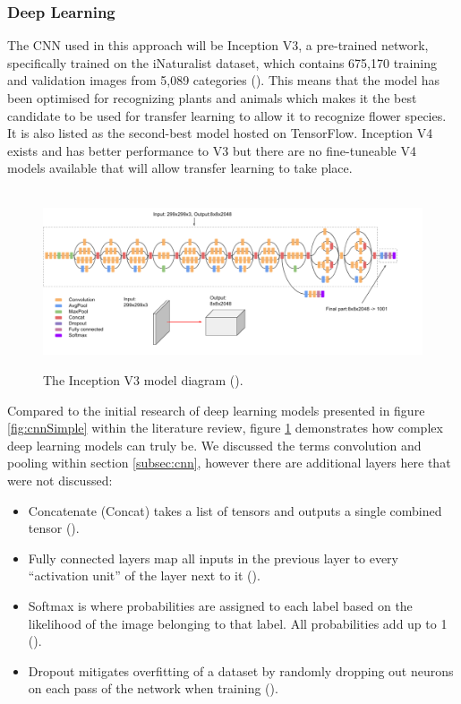\documentclass{article}
\begin{document}
\subsubsection{Deep Learning}

The CNN used in this approach will be Inception V3, a pre-trained network, specifically trained on the iNaturalist 
dataset, which contains 675,170 training and validation images from 5,089 categories (\cite{paperswithcode}). 
This means that the model has been optimised for recognizing plants and animals which makes it the best candidate to be 
used for transfer learning to allow it to recognize flower species. It is also listed as the second-best model hosted on
TensorFlow. Inception V4 exists and has better performance to V3 but there are no fine-tuneable V4 models available that
will allow transfer learning to take place.   

\begin{figure}[h]\
    \centering
    \includegraphics[width=\textwidth]{inceptionv3.png}
    \caption{The Inception V3 model diagram (\cite{GoogleCloud}).}
    \label{fig:inception}
\end{figure}

Compared to the initial research of deep learning models presented in figure \ref{fig:cnnSimple} within the literature 
review, figure \ref{fig:inception} demonstrates how complex deep learning models can truly be. 
We discussed the terms convolution and pooling within section \ref{subsec:cnn}, however there are additional layers here that were 
not discussed:

\begin{itemize}
    \item Concatenate (Concat) takes a list of tensors and outputs a single combined tensor (\cite{kerasconcat}).
    \item Fully connected layers map all inputs in the previous layer to every “activation unit” of the layer next to it
(\cite{singhsurya}).
    \item Softmax is where probabilities are assigned to each label based on the likelihood of the image belonging to 
that label. All probabilities add up to 1 (\cite{googledevcnn}). 
    \item Dropout mitigates overfitting of a dataset by randomly dropping out neurons on each pass of the network when 
    training (\cite{seb}). 
\end{itemize}
\end{document}
